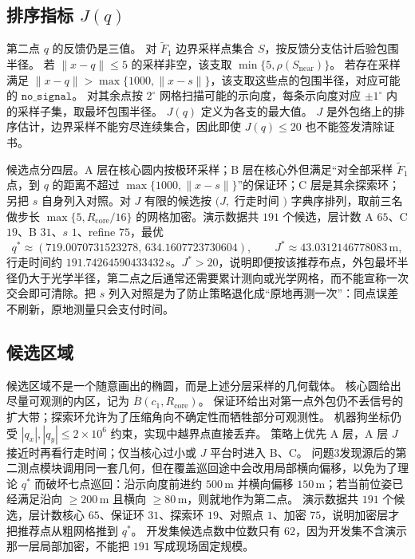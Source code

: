 \subsection{排序指标 $J(q)$}

第二点 $q$ 的反馈仍是三值。
对 $\widetilde F_1$ 边界采样点集合 $S$，按反馈分支估计后验包围半径。
若 $\|x-q\|\le 5$ 的采样非空，该支取 $\min\{5,\rho(S_{\mathrm{near}})\}$。
若存在采样满足 $\|x-q\|>\max\{1000,\|x-s\|\}$，该支取这些点的包围半径，对应可能的 $\mathtt{no\_signal}$。
对其余点按 $2^\circ$ 网格扫描可能的示向度，每条示向度对应 $\pm 1^\circ$ 内的采样子集，取最坏包围半径。
$J(q)$ 定义为各支的最大值。
$J$ 是外包络上的排序估计，边界采样不能穷尽连续集合，因此即使 $J(q)\le 20$ 也不能签发清除证书。

候选点分四层。A 层在核心圆内按极环采样；B 层在核心外但满足“对全部采样 $\widetilde F_1$ 点，到 $q$ 的距离不超过 $\max\{1000,\|x-s\|\}$”的保证环；C 层是其余探索环；另把 $s$ 自身列入对照。对 $J$ 有限的候选按 $(J,$ 行走时间 $)$ 字典序排列，取前三名做步长 $\max\{5,R_{\mathrm{core}}/16\}$ 的网格加密。演示数据共 $191$ 个候选，层计数 A $65$、C $19$、B $31$、$s$ $1$、refine $75$，最优
\begin{equation}
q^\ast\approx(719.0070731523278,\,634.1607723730604),\qquad J^\ast\approx 43.0312146778083\,\mathrm{m},
\end{equation}
行走时间约 $191.74264590433432\,\mathrm{s}$。$J^\ast>20$，说明即便按该推荐布点，外包最坏半径仍大于光学半径，第二点之后通常还需要累计测向或光学网格，而不能宣称一次交会即可清除。把 $s$ 列入对照是为了防止策略退化成“原地再测一次”：同点误差不刷新，原地测量只会支付时间。

\subsection{候选区域}

候选区域不是一个随意画出的椭圆，而是上述分层采样的几何载体。
核心圆给出尽量可观测的内区，记为 $\overline{B}(c_1,R_{\mathrm{core}})$。
保证环给出对第一点外包仍不丢信号的扩大带；探索环允许为了压缩角向不确定性而牺牲部分可观测性。
机器狗坐标仍受 $|q_x|,|q_y|\le 2\times 10^6$ 约束，实现中越界点直接丢弃。
策略上优先 A 层，A 层 $J$ 接近时再看行走时间；仅当核心过小或 $J$ 平台时进入 B、C。
问题3发现源后的第二测点模块调用同一套几何，但在覆盖巡回途中会改用局部横向偏移，以免为了理论 $q^\ast$ 而破坏七点巡回：沿示向度前进约 $500\,\mathrm{m}$ 并横向偏移 $150\,\mathrm{m}$；若当前位姿已经满足沿向 $\ge 200\,\mathrm{m}$ 且横向 $\ge 80\,\mathrm{m}$，则就地作为第二点。
演示数据共 $191$ 个候选，层计数核心 $65$、保证环 $31$、探索环 $19$、对照点 $1$、加密 $75$，说明加密层才把推荐点从粗网格推到 $q^\ast$。
开发集候选点数中位数只有 $62$，因为开发集不含演示那一层局部加密，不能把 $191$ 写成现场固定规模。

